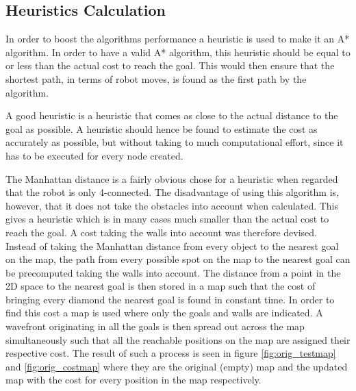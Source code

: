 \subsection{Heuristics Calculation}
In order to boost the algorithms performance a heuristic is used to make it an A* algorithm.
In order to have a valid A* algorithm, this heuristic should be equal to or less than the actual cost to reach the goal.
This would then ensure that the shortest path, in terms of robot moves, is found as the first path by the algorithm.

A good heuristic is a heuristic that comes as close to the actual distance to the goal as possible.
A heuristic should hence be found to estimate the cost as accurately as possible, but without taking to much computational effort, since it has to be executed for every node created.

The Manhattan distance is a fairly obvious chose for a heuristic when regarded that the robot is only 4-connected.
The disadvantage of using this algorithm is, however, that it does not take the obstacles into account when calculated.
This gives a heuristic which is in many cases much smaller than the actual cost to reach the goal.
A cost taking the walls into account was therefore devised.
Instead of taking the Manhattan distance from every object to the nearest goal on the map, the path from every possible spot on the map to the nearest goal can be precomputed taking the walls into account.
The distance from a point in the 2D space to the nearest goal is then stored in a map such that the cost of bringing every diamond the nearest goal is found in constant time.
In order to find this cost a map is used where only the goals and walls are indicated.
A wavefront originating in all the goals is then spread out across the map simultaneously such that all the reachable positions on the map are assigned their respective cost.
The result of such a process is seen in figure \ref{fig:orig_testmap} and \ref{fig:orig_costmap} where they are the original (empty) map and the updated map with the cost for every position in the map respectively.



